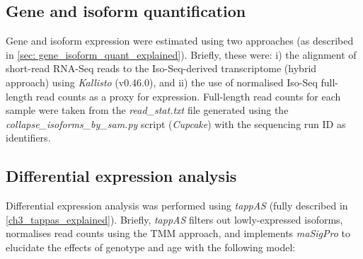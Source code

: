 \subsection{Gene and isoform quantification}
Gene and isoform expression were estimated using two approaches (as described in \cref{sec: gene_isoform_quant_explained}). Briefly, these were: i) the alignment of short-read RNA-Seq reads to the Iso-Seq-derived transcriptome (hybrid approach) using \textit{Kallisto}\cite{Bray2016} (v0.46.0), and ii) the use of normalised Iso-Seq full-length read counts as a proxy for expression. Full-length read counts for each sample were taken from the \textit{read\_stat.txt} file generated using the \textit{collapse\_isoforms\_by\_sam.py} script (\textit{Cupcake}) with the sequencing run ID as identifiers. 

\subsection{Differential expression analysis}
Differential expression analysis was performed using \textit{tappAS} (fully described in \cref{ch3_tappas_explained}). Briefly, \textit{tappAS} filters out lowly-expressed isoforms, normalises read counts using the TMM approach, and implements \textit{maSigPro}\cite{Conesa2006,Nueda2014,Conesa2017} to elucidate the effects of genotype and age with the following model\cite{Conesa2006}: 

